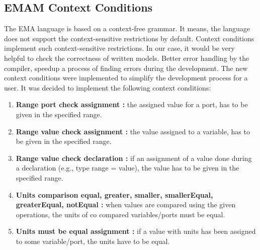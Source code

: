 \subsection{EMAM Context Conditions}
The EMA language is based on a context-free grammar. It means, the language does not support the context-sensitive restrictions by default. Context conditions implement such context-sensitive restrictions. In our case, it would be very helpful to check the correctness of written models. Better error handling by the compiler, speedup a process of finding errors during the development. The new context conditions were implemented to simplify the development process for a user. It was decided to implement the following context conditions:
\begin{enumerate}
    \item \textbf{Range port check assignment :} the assigned value for a port, has to be given in the specified range.
    \item \textbf{Range value check assignment :} the value assigned to a variable, has to be given in the specified range.
    \item \textbf{Range value check declaration :} if an assignment of a value done during a declaration (e.g., type range = value), the value has to be given in the specified range.
    \item \textbf{Units comparison equal, greater, smaller, smallerEqual, greaterEqual, notEqual :} when values are compared using the given operations, the units of co compared variables/ports must be equal.
    \item \textbf{Units must be equal assignment :} if a value with units has been assigned to some variable/port, the units have to be equal.  
\end{enumerate}
